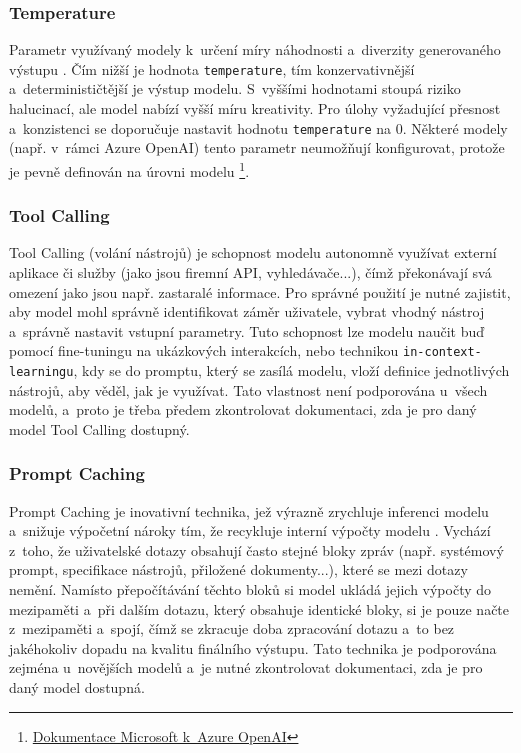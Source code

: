 \documentclass[czech, ing, kiv, he, iso690numb, viewonly]{fasthesis}
\begin{document}
\subsubsection*{Temperature}
Parametr využívaný modely k~určení míry náhodnosti a~diverzity generovaného výstupu \cite{renze2024effect}. Čím nižší je hodnota \texttt{temperature}, tím 
konzervativnější a~determinističtější je výstup modelu. S~vyššími hodnotami stoupá riziko halucinací, ale model nabízí vyšší míru kreativity. Pro úlohy vyžadující 
přesnost a~konzistenci se doporučuje nastavit hodnotu \texttt{temperature} na 0. Některé modely (např. v~rámci Azure OpenAI) tento parametr neumožňují konfigurovat, 
protože je pevně definován na úrovni modelu \footnote{\href{https://learn.microsoft.com/en-us/azure/foundry/openai/how-to/reasoning?tabs=csharp\%2Cgpt-5\#not-supported}{Dokumentace Microsoft k~Azure OpenAI}}.
\subsubsection*{Tool Calling}
Tool Calling (volání nástrojů) je schopnost modelu autonomně využívat externí aplikace či služby (jako jsou firemní API, vyhledávače...), čímž překonávají svá omezení 
jako jsou např. zastaralé informace. Pro správné použití je nutné zajistit, aby model mohl správně identifikovat záměr uživatele, vybrat vhodný nástroj a~správně nastavit vstupní parametry\cite{shen2024llm}. Tuto schopnost lze modelu naučit buď pomocí fine-tuningu na ukázkových interakcích, nebo technikou \texttt{in-context-learningu},
kdy se do promptu, který se zasílá modelu, vloží definice jednotlivých nástrojů, aby věděl, jak je využívat. Tato vlastnost není podporována u~všech modelů, a~proto 
je třeba předem zkontrolovat dokumentaci, zda je pro daný model Tool Calling dostupný.


\subsubsection*{Prompt Caching}
Prompt Caching je inovativní technika, jež výrazně zrychluje inferenci modelu a~snižuje výpočetní nároky tím, že recykluje interní výpočty modelu \cite{gim2024prompt}. 
Vychází z~toho, že uživatelské dotazy obsahují často stejné bloky zpráv (např. systémový prompt, specifikace nástrojů, přiložené dokumenty...), které se mezi
dotazy nemění. Namísto přepočítávání těchto bloků si model ukládá jejich výpočty do mezipaměti a~při dalším dotazu, který obsahuje identické bloky, 
si je pouze načte z~mezipaměti a~spojí, čímž se zkracuje doba zpracování dotazu a~to bez jakéhokoliv dopadu na kvalitu finálního výstupu. Tato technika
je podporována zejména u~novějších modelů a~je nutné zkontrolovat dokumentaci, zda je pro daný model dostupná.
\end{document}
